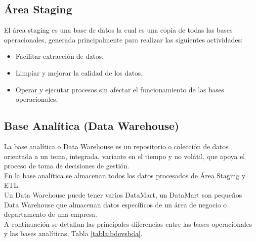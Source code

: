 \subsection{Área Staging}

El área staging es una base de datos la cual es una copia de todas las bases operacionales, generada principalmente para realizar las siguientes actividades:

\begin{itemize}
    \item Facilitar extracción de datos.
    \item Limpiar y mejorar la calidad de los datos.
    \item Operar y ejecutar procesos sin afectar el funcionamiento de las bases operacionales.
\end{itemize}

\subsection{Base Analítica (Data Warehouse)}

La base analítica o Data Warehouse es un repositorio o colección de datos orientada a un tema, integrada, variante en el tiempo y no volátil, que apoya el proceso de toma de decisiones de gestión.\\

En la base analítica se almacenan todos los datos procesados de Área Staging y ETL.\\

Un Data Warehouse puede tener varios DataMart, un DataMart son pequeños Data Warehouse que almacenan datos específicos de un área de negocio o departamento de una empresa.\\

A continuación se detallan las principales diferencias entre las bases operacionales y las bases analíticas, Tabla \ref{tabla:bdovsbda}. 

